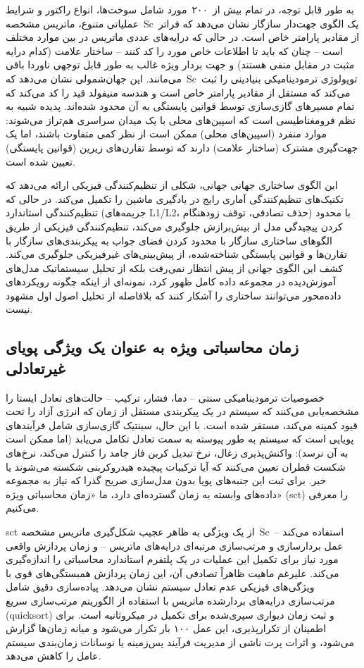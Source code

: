 \documentclass[12pt, a4paper]{article}
\begin{document}
به طور قابل توجه، در تمام بیش از ۲۰۰ مورد شامل سوخت‌ها، انواع راکتور و شرایط عملیاتی متنوع، ماتریس مشخصه Sc یک الگوی جهت‌دار سازگار نشان می‌دهد که فراتر از مقادیر پارامتر خاص است. در حالی که درایه‌های عددی ماتریس در بین موارد مختلف است – چنان که باید تا اطلاعات خاص مورد را کد کنند – ساختار علامت (کدام درایه مثبت در مقابل منفی هستند) و جهت بردار ویژه غالب به طور قابل توجهی ناوردا باقی می‌مانند. این جهان‌شمولی نشان می‌دهد که Sc توپولوژی ترمودینامیکی بنیادینی را ثبت می‌کند که مستقل از مقادیر پارامتر خاص است و هندسه منیفولد قید را کد می‌کند که تمام مسیرهای گازی‌سازی توسط قوانین پایستگی به آن محدود شده‌اند. پدیده شبیه به نظم فرومغناطیسی است که اسپین‌های محلی با یک میدان سراسری هم‌تراز می‌شوند: موارد منفرد (اسپین‌های محلی) ممکن است از نظر کمی متفاوت باشند، اما یک جهت‌گیری مشترک (ساختار علامت) دارند که توسط تقارن‌های زیرین (قوانین پایستگی) تعیین شده است.

این الگوی ساختاری جهانی جهانی، شکلی از تنظیم‌کنندگی فیزیکی ارائه می‌دهد که تکنیک‌های تنظیم‌کنندگی آماری رایج در یادگیری ماشین را تکمیل می‌کند. در حالی که تنظیم‌کنندگی استاندارد (جریمه‌های L1/L2، حذف تصادفی، توقف زودهنگام) با محدود کردن پیچیدگی مدل از بیش‌برازش جلوگیری می‌کند، تنظیم‌کنندگی فیزیکی از طریق الگوهای ساختاری سازگار با محدود کردن فضای جواب به پیکربندی‌های سازگار با تقارن‌ها و قوانین پایستگی شناخته‌شده، از پیش‌بینی‌های غیرفیزیکی جلوگیری می‌کند. کشف این الگوی جهانی از پیش انتظار نمی‌رفت بلکه از تحلیل سیستماتیک مدل‌های آموزش‌دیده در مجموعه داده کامل ظهور کرد، نمونه‌ای از اینکه چگونه رویکردهای داده‌محور می‌توانند ساختاری را آشکار کنند که بلافاصله از تحلیل اصول اول مشهود نیست.

\subsection{زمان محاسباتی ویژه به عنوان یک ویژگی پویای غیرتعادلی}

خصوصیات ترمودینامیکی سنتی – دما، فشار، ترکیب – حالت‌های تعادل ایستا را مشخصه‌یابی می‌کنند که سیستم در یک پیکربندی مستقل از زمان که انرژی آزاد را تحت قیود کمینه می‌کند، مستقر شده است. با این حال، سینتیک گازی‌سازی شامل فرآیندهای پویایی است که سیستم به طور پیوسته به سمت تعادل تکامل می‌یابد (اما ممکن است به آن نرسد): واکنش‌پذیری زغال، نرخ تبدیل کربن فاز جامد را کنترل می‌کند، نرخ‌های شکست قطران تعیین می‌کنند که آیا ترکیبات پیچیده هیدروکربنی شکسته می‌شوند یا خیر. برای ثبت این جنبه‌های پویا بدون مدل‌سازی صریح گذرا که نیاز به مجموعه داده‌های وابسته به زمان گسترده‌ای دارد، ما «زمان محاسباتی ویژه» (sct) را معرفی می‌کنیم.

sct از یک ویژگی به ظاهر عجیب شکل‌گیری ماتریس مشخصه Sc استفاده می‌کند – عمل بردارسازی و مرتب‌سازی مرتبه‌ای درایه‌های ماتریس – و زمان پردازش واقعی مورد نیاز برای تکمیل این عملیات در یک پلتفرم استاندارد محاسباتی را اندازه‌گیری می‌کند. علیرغم ماهیت ظاهراً تصادفی آن، این زمان پردازش همبستگی‌های قوی با ویژگی‌های فیزیکی عدم تعادل سیستم نشان می‌دهد. پیاده‌سازی دقیق شامل مرتب‌سازی درایه‌های بردارشده ماتریس با استفاده از الگوریتم مرتب‌سازی سریع (quicksort) و ثبت زمان دیواری سپری‌شده برای تکمیل در میکروثانیه است. برای اطمینان از تکرارپذیری، این عمل ۱۰۰ بار تکرار می‌شود و میانه زمان‌ها گزارش می‌شود، و اثرات پرت ناشی از مدیریت فرآیند پس‌زمینه یا نوسانات زمان‌بندی سیستم عامل را کاهش می‌دهد.
\end{document}
